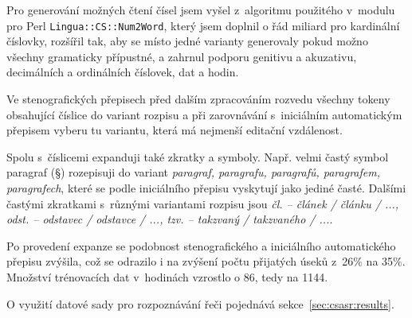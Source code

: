 Pro generování možných čtení čísel jsem vyšel z~algoritmu použitého v~modulu pro
Perl \texttt{Lingua::CS::Num2Word}, který jsem doplnil o řád miliard pro
kardinální číslovky, rozšířil tak, aby se místo jedné varianty generovaly
pokud možno všechny gramaticky přípustné, a zahrnul podporu genitivu a
akuzativu, decimálních a ordinálních číslovek, dat a hodin.

Ve stenografických přepisech před dalším zpracováním rozvedu všechny tokeny
obsahující číslice do variant rozpisu a při zarovnávání s~iniciálním
automatickým přepisem vyberu tu variantu, která má nejmenší editační vzdálenost.

Spolu s~číslicemi expanduji také zkratky a symboly. Např. velmi častý symbol
paragraf (§) rozepisuji do variant {\em paragraf, paragrafu, paragrafů,
paragrafem, paragrafech}, které se podle iniciálního přepisu vyskytují jako
jediné časté. Dalšími častými zkratkami s~různými variantami rozpisu jsou {\em
čl. -- článek / článku / ..., odst. -- odstavec / odstavce / ..., tzv. --
takzvaný / takzvaného / ...}.

Po provedení expanze se podobnost stenografického a iniciálního automatického
přepisu zvýšila, což se odrazilo i na zvýšení počtu přijatých úseků z~26\% na
35\%. Množství trénovacích dat v~hodinách vzrostlo o 86, tedy na 1144.

O využití datové sady pro rozpoznávání řeči pojednává sekce~\ref{sec:csasr:results}.

